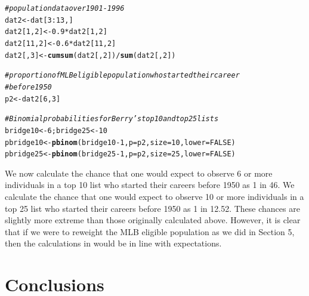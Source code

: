 \documentclass[11pt]{article}\usepackage[]{graphicx}\usepackage[]{color}
\makeatletter
\newcommand{\hlnum}[1]{\textcolor[rgb]{0.686,0.059,0.569}{#1}}%
\newcommand{\hlcom}[1]{\textcolor[rgb]{0.678,0.584,0.686}{\textit{#1}}}%
\newcommand{\hlopt}[1]{\textcolor[rgb]{0,0,0}{#1}}%
\newcommand{\hlstd}[1]{\textcolor[rgb]{0.345,0.345,0.345}{#1}}%
\newcommand{\hlkwb}[1]{\textcolor[rgb]{0.69,0.353,0.396}{#1}}%
\newcommand{\hlkwc}[1]{\textcolor[rgb]{0.333,0.667,0.333}{#1}}%
\newcommand{\hlkwd}[1]{\textcolor[rgb]{0.737,0.353,0.396}{\textbf{#1}}}%
\newenvironment{kframe}{%
 \def\at@end@of@kframe{}%
 \ifinner\ifhmode%
  \def\at@end@of@kframe{\end{minipage}}%
  \begin{minipage}{\columnwidth}%
 \fi\fi%
 \def\FrameCommand##1{\hskip\@totalleftmargin \hskip-\fboxsep
 \colorbox{shadecolor}{##1}\hskip-\fboxsep
     \hskip-\linewidth \hskip-\@totalleftmargin \hskip\columnwidth}%
 \MakeFramed {\advance\hsize-\width
   \@totalleftmargin\z@ \linewidth\hsize
   \@setminipage}}%
 {\par\unskip\endMakeFramed%
 \at@end@of@kframe}
\newenvironment{knitrout}{}{} %
\makeatother
\begin{document}
\begin{knitrout}
\color{fgcolor}\begin{kframe}
\begin{alltt}
\hlcom{# population data over 1901-1996}
\hlstd{dat2} \hlkwb{<-} \hlstd{dat[}\hlnum{3}\hlopt{:}\hlnum{13}\hlstd{, ]}
\hlstd{dat2[}\hlnum{1}\hlstd{,} \hlnum{2}\hlstd{]} \hlkwb{<-} \hlnum{0.9} \hlopt{*} \hlstd{dat2[}\hlnum{1}\hlstd{,} \hlnum{2}\hlstd{]}
\hlstd{dat2[}\hlnum{11}\hlstd{,} \hlnum{2}\hlstd{]} \hlkwb{<-} \hlnum{0.6} \hlopt{*} \hlstd{dat2[}\hlnum{11}\hlstd{,} \hlnum{2}\hlstd{]}
\hlstd{dat2[,} \hlnum{3}\hlstd{]} \hlkwb{<-} \hlkwd{cumsum}\hlstd{(dat2[,} \hlnum{2}\hlstd{])} \hlopt{/} \hlkwd{sum}\hlstd{(dat2[,} \hlnum{2}\hlstd{])}

\hlcom{# proportion of MLB eligible population who started their career }
\hlcom{# before 1950}
\hlstd{p2} \hlkwb{<-} \hlstd{dat2[}\hlnum{6}\hlstd{,} \hlnum{3}\hlstd{]}

\hlcom{# Binomial probabilities for Berry's top 10 and top 25 lists}
\hlstd{bridge10} \hlkwb{<-} \hlnum{6}\hlstd{; bridge25} \hlkwb{<-} \hlnum{10}
\hlstd{pbridge10} \hlkwb{<-} \hlkwd{pbinom}\hlstd{(bridge10} \hlopt{-} \hlnum{1}\hlstd{,} \hlkwc{p} \hlstd{= p2,} \hlkwc{size} \hlstd{=} \hlnum{10}\hlstd{,} \hlkwc{lower} \hlstd{=} \hlnum{FALSE}\hlstd{)}
\hlstd{pbridge25} \hlkwb{<-} \hlkwd{pbinom}\hlstd{(bridge25} \hlopt{-} \hlnum{1}\hlstd{,} \hlkwc{p} \hlstd{= p2,} \hlkwc{size} \hlstd{=} \hlnum{25}\hlstd{,} \hlkwc{lower} \hlstd{=} \hlnum{FALSE}\hlstd{)}
\end{alltt}
\end{kframe}
\end{knitrout}


We now calculate the chance that one would expect to observe 6 or more individuals in a top 10 list who started their careers before 1950 as 1 in 46. We calculate the chance that one would expect to observe 10 or more individuals in a top 25 list who started their careers before 1950 as 1 in 12.52.  These chances are slightly more extreme than those originally calculated above.  However, it is clear that if we were to reweight the MLB eligible population as we did in Section 5, then the calculations in \citet{berry1999eras} would be in line with expectations.



\section{Conclusions}
\end{document}
